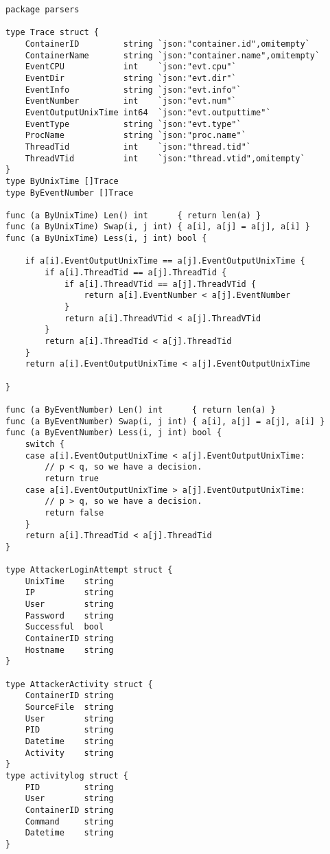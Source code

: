 \begin{verbatim}
package parsers

type Trace struct {
	ContainerID         string `json:"container.id",omitempty`
	ContainerName       string `json:"container.name",omitempty`
	EventCPU            int    `json:"evt.cpu"`
	EventDir            string `json:"evt.dir"`
	EventInfo           string `json:"evt.info"`
	EventNumber         int    `json:"evt.num"`
	EventOutputUnixTime int64  `json:"evt.outputtime"`
	EventType           string `json:"evt.type"`
	ProcName            string `json:"proc.name"`
	ThreadTid           int    `json:"thread.tid"`
	ThreadVTid          int    `json:"thread.vtid",omitempty`
}
type ByUnixTime []Trace
type ByEventNumber []Trace

func (a ByUnixTime) Len() int      { return len(a) }
func (a ByUnixTime) Swap(i, j int) { a[i], a[j] = a[j], a[i] }
func (a ByUnixTime) Less(i, j int) bool {

	if a[i].EventOutputUnixTime == a[j].EventOutputUnixTime {
		if a[i].ThreadTid == a[j].ThreadTid {
			if a[i].ThreadVTid == a[j].ThreadVTid {
				return a[i].EventNumber < a[j].EventNumber
			}
			return a[i].ThreadVTid < a[j].ThreadVTid
		}
		return a[i].ThreadTid < a[j].ThreadTid
	}
	return a[i].EventOutputUnixTime < a[j].EventOutputUnixTime

}

func (a ByEventNumber) Len() int      { return len(a) }
func (a ByEventNumber) Swap(i, j int) { a[i], a[j] = a[j], a[i] }
func (a ByEventNumber) Less(i, j int) bool {
	switch {
	case a[i].EventOutputUnixTime < a[j].EventOutputUnixTime:
		// p < q, so we have a decision.
		return true
	case a[i].EventOutputUnixTime > a[j].EventOutputUnixTime:
		// p > q, so we have a decision.
		return false
	}
	return a[i].ThreadTid < a[j].ThreadTid
}

type AttackerLoginAttempt struct {
	UnixTime    string
	IP          string
	User        string
	Password    string
	Successful  bool
	ContainerID string
	Hostname    string
}

type AttackerActivity struct {
	ContainerID string
	SourceFile  string
	User        string
	PID         string
	Datetime    string
	Activity    string
}
type activitylog struct {
	PID         string
	User        string
	ContainerID string
	Command     string
	Datetime    string
}

\end{verbatim}

